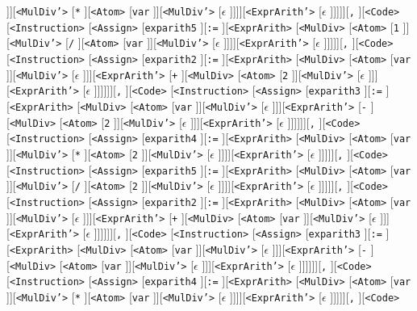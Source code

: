 \documentclass[border=5pt]{standalone}
\begin{document}
]][{\texttt{<MulDiv'>}} [{\texttt{*}} ][{\texttt{<Atom>}} [{\texttt{var}} ]][{\texttt{<MulDiv'>}} [{$\epsilon$} ]]]][{\texttt{<ExprArith'>}} [{$\epsilon$} ]]]]][{\texttt{,}} ][{\texttt{<Code>}} [{\texttt{<Instruction>}} [{\texttt{<Assign>}} [{\texttt{exparith5}} ][{\texttt{:=}} ][{\texttt{<ExprArith>}} [{\texttt{<MulDiv>}} [{\texttt{<Atom>}} [{\texttt{1}} ]][{\texttt{<MulDiv'>}} [{\texttt{/}} ][{\texttt{<Atom>}} [{\texttt{var}} ]][{\texttt{<MulDiv'>}} [{$\epsilon$} ]]]][{\texttt{<ExprArith'>}} [{$\epsilon$} ]]]]][{\texttt{,}} ][{\texttt{<Code>}} [{\texttt{<Instruction>}} [{\texttt{<Assign>}} [{\texttt{exparith2}} ][{\texttt{:=}} ][{\texttt{<ExprArith>}} [{\texttt{<MulDiv>}} [{\texttt{<Atom>}} [{\texttt{var}} ]][{\texttt{<MulDiv'>}} [{$\epsilon$} ]]][{\texttt{<ExprArith'>}} [{\texttt{+}} ][{\texttt{<MulDiv>}} [{\texttt{<Atom>}} [{\texttt{2}} ]][{\texttt{<MulDiv'>}} [{$\epsilon$} ]]][{\texttt{<ExprArith'>}} [{$\epsilon$} ]]]]]][{\texttt{,}} ][{\texttt{<Code>}} [{\texttt{<Instruction>}} [{\texttt{<Assign>}} [{\texttt{exparith3}} ][{\texttt{:=}} ][{\texttt{<ExprArith>}} [{\texttt{<MulDiv>}} [{\texttt{<Atom>}} [{\texttt{var}} ]][{\texttt{<MulDiv'>}} [{$\epsilon$} ]]][{\texttt{<ExprArith'>}} [{\texttt{-}} ][{\texttt{<MulDiv>}} [{\texttt{<Atom>}} [{\texttt{2}} ]][{\texttt{<MulDiv'>}} [{$\epsilon$} ]]][{\texttt{<ExprArith'>}} [{$\epsilon$} ]]]]]][{\texttt{,}} ][{\texttt{<Code>}} [{\texttt{<Instruction>}} [{\texttt{<Assign>}} [{\texttt{exparith4}} ][{\texttt{:=}} ][{\texttt{<ExprArith>}} [{\texttt{<MulDiv>}} [{\texttt{<Atom>}} [{\texttt{var}} ]][{\texttt{<MulDiv'>}} [{\texttt{*}} ][{\texttt{<Atom>}} [{\texttt{2}} ]][{\texttt{<MulDiv'>}} [{$\epsilon$} ]]]][{\texttt{<ExprArith'>}} [{$\epsilon$} ]]]]][{\texttt{,}} ][{\texttt{<Code>}} [{\texttt{<Instruction>}} [{\texttt{<Assign>}} [{\texttt{exparith5}} ][{\texttt{:=}} ][{\texttt{<ExprArith>}} [{\texttt{<MulDiv>}} [{\texttt{<Atom>}} [{\texttt{var}} ]][{\texttt{<MulDiv'>}} [{\texttt{/}} ][{\texttt{<Atom>}} [{\texttt{2}} ]][{\texttt{<MulDiv'>}} [{$\epsilon$} ]]]][{\texttt{<ExprArith'>}} [{$\epsilon$} ]]]]][{\texttt{,}} ][{\texttt{<Code>}} [{\texttt{<Instruction>}} [{\texttt{<Assign>}} [{\texttt{exparith2}} ][{\texttt{:=}} ][{\texttt{<ExprArith>}} [{\texttt{<MulDiv>}} [{\texttt{<Atom>}} [{\texttt{var}} ]][{\texttt{<MulDiv'>}} [{$\epsilon$} ]]][{\texttt{<ExprArith'>}} [{\texttt{+}} ][{\texttt{<MulDiv>}} [{\texttt{<Atom>}} [{\texttt{var}} ]][{\texttt{<MulDiv'>}} [{$\epsilon$} ]]][{\texttt{<ExprArith'>}} [{$\epsilon$} ]]]]]][{\texttt{,}} ][{\texttt{<Code>}} [{\texttt{<Instruction>}} [{\texttt{<Assign>}} [{\texttt{exparith3}} ][{\texttt{:=}} ][{\texttt{<ExprArith>}} [{\texttt{<MulDiv>}} [{\texttt{<Atom>}} [{\texttt{var}} ]][{\texttt{<MulDiv'>}} [{$\epsilon$} ]]][{\texttt{<ExprArith'>}} [{\texttt{-}} ][{\texttt{<MulDiv>}} [{\texttt{<Atom>}} [{\texttt{var}} ]][{\texttt{<MulDiv'>}} [{$\epsilon$} ]]][{\texttt{<ExprArith'>}} [{$\epsilon$} ]]]]]][{\texttt{,}} ][{\texttt{<Code>}} [{\texttt{<Instruction>}} [{\texttt{<Assign>}} [{\texttt{exparith4}} ][{\texttt{:=}} ][{\texttt{<ExprArith>}} [{\texttt{<MulDiv>}} [{\texttt{<Atom>}} [{\texttt{var}} ]][{\texttt{<MulDiv'>}} [{\texttt{*}} ][{\texttt{<Atom>}} [{\texttt{var}} ]][{\texttt{<MulDiv'>}} [{$\epsilon$} ]]]][{\texttt{<ExprArith'>}} [{$\epsilon$} ]]]]][{\texttt{,}} ][{\texttt{<Code>}} 
\end{document}
